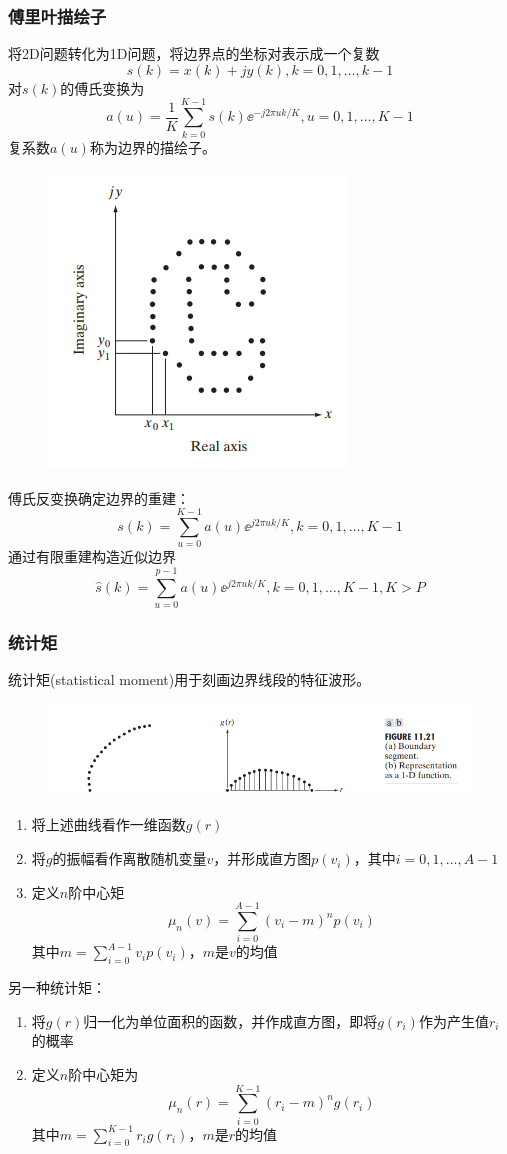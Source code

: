 \subsubsection{傅里叶描绘子}
将2D问题转化为1D问题，将边界点的坐标对表示成一个复数
\[s(k)=x(k)+jy(k),k=0,1,\ldots,k-1\]
对$s(k)$的傅氏变换为
\[a(u)=\frac{1}{K}\sum_{k=0}^{K-1}s(k)\ee^{-j2\pi uk/K},u=0,1,\ldots,K-1\]
复系数$a(u)$称为边界的描绘子。
\begin{figure}[H]
\centering
\includegraphics[width=0.3\linewidth]{fig/fourier_descriptor.png}
\end{figure}

傅氏反变换确定边界的重建：
\[s(k)=\sum_{u=0}^{K-1}a(u)\ee^{j2\pi uk/K},k=0,1,\ldots,K-1\]
通过有限重建构造近似边界
\[\hat{s}(k)=\sum_{u=0}^{p-1}a(u)\ee^{j2\pi uk/K},k=0,1,\ldots,K-1,K>P\]

\subsubsection{统计矩}
统计矩(statistical moment)用于刻画边界线段的特征波形。
\begin{figure}[H]
\centering
\includegraphics[width=0.8\linewidth]{fig/statistical_moment.png}
\end{figure}
\begin{enumerate}
	\item 将上述曲线看作一维函数$g(r)$
	\item 将$g$的振幅看作离散随机变量$v$，并形成直方图$p(v_i)$，其中$i=0,1,\ldots,A-1$
	\item 定义$n$阶中心矩
	\[\mu_n(v)=\sum_{i=0}^{A-1}(v_i-m)^np(v_i)\]
	其中$m=\sum_{i=0}^{A-1}v_ip(v_i)$，$m$是$v$的均值
\end{enumerate}

另一种统计矩：
\begin{enumerate}
	\item 将$g(r)$归一化为单位面积的函数，并作成直方图，即将$g(r_i)$作为产生值$r_i$的概率
	\item 定义$n$阶中心矩为
	\[\mu_n(r)=\sum_{i=0}^{K-1}(r_i-m)^ng(r_i)\]
	其中$m=\sum_{i=0}^{K-1}r_ig(r_i)$，$m$是$r$的均值
\end{enumerate}



